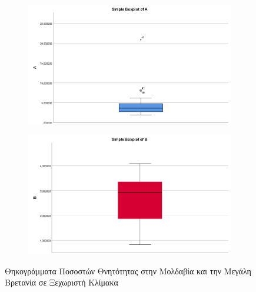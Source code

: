 \documentclass{article}
\begin{document}
    \begin{figure}[H]
    
        \centering	
    	\begin{adjustbox}{center}
            \begin{subfigure}[c]{.7\textwidth}
    			\includegraphics[width=1\textwidth,height=\textheight,keepaspectratio]{media/2/boxplotA.png}
    		\end{subfigure}
    
    		\begin{subfigure}[c]{.7\textwidth}    
    			\includegraphics[width=1\textwidth,height=\textheight,keepaspectratio]{media/2/boxplotB.png}
    		\end{subfigure}%
    	\end{adjustbox}
    	\caption{Θηκογράμματα Ποσοστών Θνητότητας στην Μολδαβία και την Μεγάλη Βρετανία σε Ξεχωριστή Κλίμακα}
    	\label{boxplot_separate}
    \end{figure}
    
\end{document}

